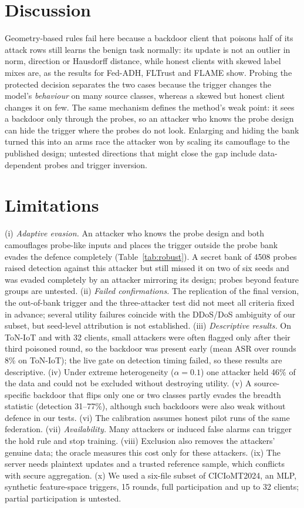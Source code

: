 \documentclass[conference]{IEEEtran}
\begin{document}
\section{Discussion}
Geometry-based rules fail here because a backdoor client that poisons half of its attack rows still learns the benign task normally: its update is not an outlier in norm, direction or Hausdorff distance, while honest clients with skewed label mixes are, as the results for Fed-ADH, FLTrust and FLAME show. Probing the protected decision separates the two cases because the trigger changes the model's \emph{behaviour} on many source classes, whereas a skewed but honest client changes it on few. The same mechanism defines the method's weak point: it sees a backdoor only through the probes, so an attacker who knows the probe design can hide the trigger where the probes do not look. Enlarging and hiding the bank turned this into an arms race the attacker won by scaling its camouflage to the published design; untested directions that might close the gap include data-dependent probes and trigger inversion.
\section{Limitations}
\label{sec:limits}
(i) \emph{Adaptive evasion.} An attacker who knows the probe design and both camouflages probe-like inputs and places the trigger outside the probe bank evades the defence completely (Table~\ref{tab:robust}). A secret bank of 4508 probes raised detection against this attacker but still missed it on two of six seeds and was evaded completely by an attacker mirroring its design; probes beyond feature groups are untested. (ii) \emph{Failed confirmations.} The replication of the final version, the out-of-bank trigger and the three-attacker test did not meet all criteria fixed in advance; several utility failures coincide with the DDoS/DoS ambiguity of our subset, but seed-level attribution is not established. (iii) \emph{Descriptive results.} On ToN-IoT and with 32 clients, small attackers were often flagged only after their third poisoned round, so the backdoor was present early (mean ASR over rounds 8\% on ToN-IoT); the live gate on detection timing failed, so these results are descriptive. (iv) Under extreme heterogeneity ($\alpha=0.1$) one attacker held 46\% of the data and could not be excluded without destroying utility. (v) A source-specific backdoor that flips only one or two classes partly evades the breadth statistic (detection 31--77\%), although such backdoors were also weak without defence in our tests. (vi) The calibration assumes honest pilot runs of the same federation. (vii) \emph{Availability.} Many attackers or induced false alarms can trigger the hold rule and stop training. (viii) Exclusion also removes the attackers' genuine data; the oracle measures this cost only for these attackers. (ix) The server needs plaintext updates and a trusted reference sample, which conflicts with secure aggregation. (x) We used a six-file subset of CICIoMT2024, an MLP, synthetic feature-space triggers, 15 rounds, full participation and up to 32 clients; partial participation is untested.
\end{document}
